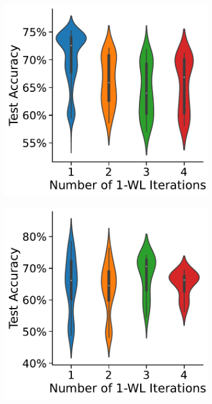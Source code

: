 \begin{figure}[!b]
\begin{subfigure}[b]{0.19\textwidth}
        \caption{\scriptsize\nci}
	\end{subfigure}
	\hfill
	\begin{subfigure}[b]{0.19\textwidth}
		\centering
		\includegraphics[width=\textwidth]{Figures/k_wl_violin_PROTEINS.pdf}
        \caption{\scriptsize\proteins}
	\end{subfigure}
	\par\bigskip
	\begin{subfigure}[b]{0.19\textwidth}
		\centering
		\includegraphics[width=\textwidth]{Figures/k_wl_violin_REDDIT-BINARY.pdf}

\end{subfigure}
\end{figure}
